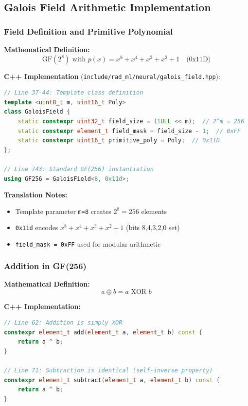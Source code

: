\documentclass[11pt,a4paper]{article}
\begin{document}
\subsection{Galois Field Arithmetic Implementation}

\subsubsection{Field Definition and Primitive Polynomial}

\textbf{Mathematical Definition:}
\begin{equation}
\text{GF}(2^8) \text{ with } p(x) = x^8 + x^4 + x^3 + x^2 + 1 \quad \text{(0x11D)}
\end{equation}

\textbf{C++ Implementation} (\texttt{include/rad\_ml/neural/galois\_field.hpp}):

\begin{lstlisting}[language=C++, basicstyle=\small\ttfamily]
// Line 37-44: Template class definition
template <uint8_t m, uint16_t Poly>
class GaloisField {
    static constexpr uint32_t field_size = (1ULL << m);  // 2^m = 256
    static constexpr element_t field_mask = field_size - 1;  // 0xFF
    static constexpr uint16_t primitive_poly = Poly;  // 0x11D
};

// Line 743: Standard GF(256) instantiation
using GF256 = GaloisField<8, 0x11d>;
\end{lstlisting}

\textbf{Translation Notes:}
\begin{itemize}
    \item Template parameter \texttt{m=8} creates $2^8 = 256$ elements
    \item \texttt{0x11d} encodes $x^8 + x^4 + x^3 + x^2 + 1$ (bits 8,4,3,2,0 set)
    \item \texttt{field\_mask = 0xFF} used for modular arithmetic
\end{itemize}

\subsubsection{Addition in GF(256)}

\textbf{Mathematical Definition:}
\begin{equation}
a \oplus b = a \text{ XOR } b
\end{equation}

\textbf{C++ Implementation:}
\begin{lstlisting}[language=C++, basicstyle=\small\ttfamily]
// Line 62: Addition is simply XOR
constexpr element_t add(element_t a, element_t b) const {
    return a ^ b;
}

// Line 71: Subtraction is identical (self-inverse property)
constexpr element_t subtract(element_t a, element_t b) const {
    return a ^ b;
}
\end{lstlisting}
\end{document}
